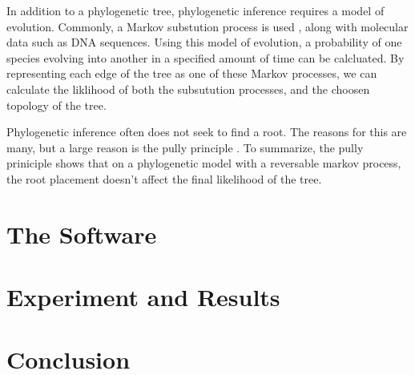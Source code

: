 \documentclass{article}
\begin{document}
In addition to a phylogenetic tree, phylogenetic inference requires a model of
evolution. Commonly, a Markov substution process is used
\cite{yang_computational_2006}, along with molecular data such as DNA sequences.
Using this model of evolution, a probability of one species evolving into
another in a specified amount of time can be calcluated. By representing each
edge of the tree as one of these Markov processes, we can calculate the
liklihood of both the subsutution processes, and the choosen topology of the
tree.

Phylogenetic inference often does not seek to find a root. The reasons for this
are many, but a large reason is the pully principle
\cite{felsenstein_evolutionary_1981}. To summarize, the pully priniciple shows
that on a phylogenetic model with a reversable markov process, the root
placement doesn't affect the final likelihood of the tree.

\section{The Software}


\section{Experiment and Results}



\section{Conclusion}




\end{document}

